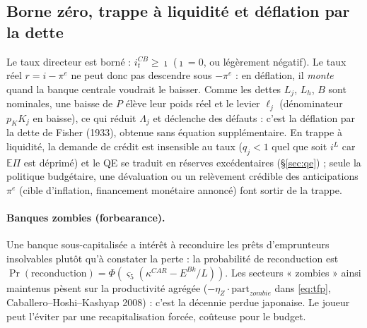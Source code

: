 \documentclass[11pt,a4paper]{article}
\newcommand{\og}{« }
\newcommand{\fg}{ »}
\newcommand{\E}{\mathbb{E}}
\begin{document}
\subsection{Borne zéro, trappe à liquidité et déflation par la dette}
\label{sec:zlb}
Le taux directeur est borné : $i^{CB}_t \ge \underline{\imath}$ ($\underline\imath = 0$, ou légèrement négatif). Le taux réel $r = i - \pi^e$ ne peut donc pas descendre sous $-\pi^e$ : en déflation, il \emph{monte} quand la banque centrale voudrait le baisser. Comme les dettes $L_j$, $L_h$, $B$ sont nominales, une baisse de $P$ élève leur poids réel et le levier $\ell_j$ (dénominateur $p_K K_j$ en baisse), ce qui réduit $\Lambda_j$ et déclenche des défauts : c'est la déflation par la dette de Fisher (1933), obtenue sans équation supplémentaire. En trappe à liquidité, la demande de crédit est insensible au taux ($q_j < 1$ quel que soit $i^L$ car $\E\Pi$ est déprimé) et le QE se traduit en réserves excédentaires (\S\ref{sec:qe}) ; seule la politique budgétaire, une dévaluation ou un relèvement crédible des anticipations $\pi^e$ (cible d'inflation, financement monétaire annoncé) font sortir de la trappe.

\paragraph{Banques zombies (forbearance).} Une banque sous-capitalisée a intérêt à reconduire les prêts d'emprunteurs insolvables plutôt qu'à constater la perte : la probabilité de reconduction est $\Pr(\text{reconduction}) = \Phi(\varsigma_5(\kappa^{CAR} - E^{Bk}/L))$. Les secteurs \og zombies\fg{} ainsi maintenus pèsent sur la productivité agrégée ($-\eta_Z\cdot \text{part}_{zombie}$ dans \eqref{eq:tfp}, Caballero--Hoshi--Kashyap 2008) : c'est la décennie perdue japonaise. Le joueur peut l'éviter par une recapitalisation forcée, coûteuse pour le budget.
\end{document}

